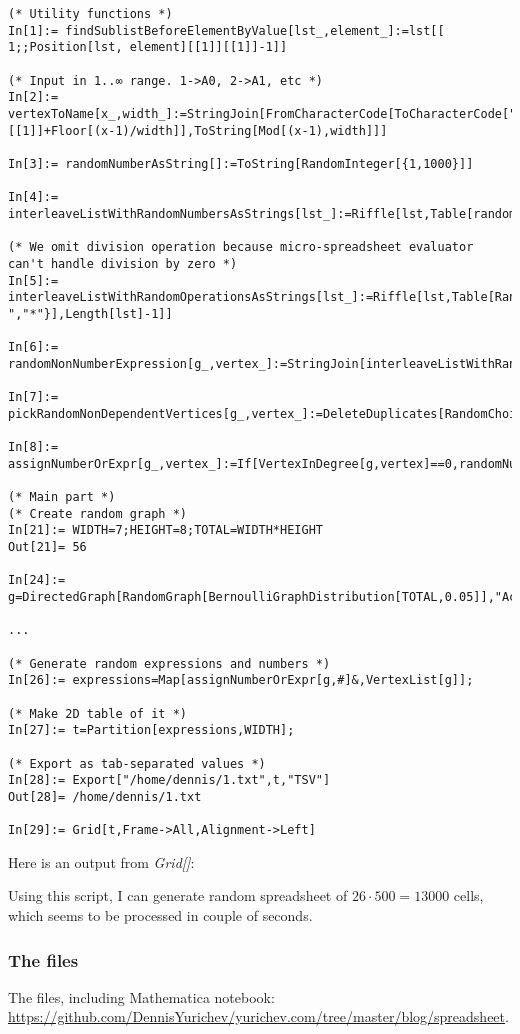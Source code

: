 \begin{lstlisting}
(* Utility functions *)
In[1]:= findSublistBeforeElementByValue[lst_,element_]:=lst[[ 1;;Position[lst, element][[1]][[1]]-1]]

(* Input in 1..∞ range. 1->A0, 2->A1, etc *)
In[2]:= vertexToName[x_,width_]:=StringJoin[FromCharacterCode[ToCharacterCode["A"][[1]]+Floor[(x-1)/width]],ToString[Mod[(x-1),width]]]

In[3]:= randomNumberAsString[]:=ToString[RandomInteger[{1,1000}]]

In[4]:= interleaveListWithRandomNumbersAsStrings[lst_]:=Riffle[lst,Table[randomNumberAsString[],Length[lst]-1]]

(* We omit division operation because micro-spreadsheet evaluator can't handle division by zero *)
In[5]:= interleaveListWithRandomOperationsAsStrings[lst_]:=Riffle[lst,Table[RandomChoice[{"+","-","*"}],Length[lst]-1]]

In[6]:= randomNonNumberExpression[g_,vertex_]:=StringJoin[interleaveListWithRandomOperationsAsStrings[interleaveListWithRandomNumbersAsStrings[Map[vertexToName[#,WIDTH]&,pickRandomNonDependentVertices[g,vertex]]]]]

In[7]:= pickRandomNonDependentVertices[g_,vertex_]:=DeleteDuplicates[RandomChoice[findSublistBeforeElementByValue[TopologicalSort[g],vertex],RandomInteger[{1,5}]]]

In[8]:= assignNumberOrExpr[g_,vertex_]:=If[VertexInDegree[g,vertex]==0,randomNumberAsString[],randomNonNumberExpression[g,vertex]]

(* Main part *) 
(* Create random graph *)
In[21]:= WIDTH=7;HEIGHT=8;TOTAL=WIDTH*HEIGHT
Out[21]= 56

In[24]:= g=DirectedGraph[RandomGraph[BernoulliGraphDistribution[TOTAL,0.05]],"Acyclic"];

...

(* Generate random expressions and numbers *)
In[26]:= expressions=Map[assignNumberOrExpr[g,#]&,VertexList[g]];

(* Make 2D table of it *)
In[27]:= t=Partition[expressions,WIDTH];

(* Export as tab-separated values *)
In[28]:= Export["/home/dennis/1.txt",t,"TSV"]
Out[28]= /home/dennis/1.txt

In[29]:= Grid[t,Frame->All,Alignment->Left]
\end{lstlisting}

Here is an output from \textit{Grid[]}:



Using this script, I can generate random spreadsheet of $26 \cdot 500=13000$ cells,
which seems to be processed in couple of seconds.

\subsubsection{The files}

The files, including Mathematica notebook: \url{https://github.com/DennisYurichev/yurichev.com/tree/master/blog/spreadsheet}.

